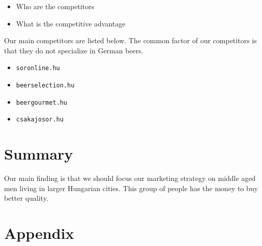 \begin{itemize}
   \item Who are the competitors
   \item What is the competitive advantage
\end{itemize}

Our main competitors are listed below. The common factor of our competitors is that they do not specialize in German beers.
\begin{itemize}
   \item \texttt{soronline.hu} \cite{soronline}
   \item \texttt{beerselection.hu} \cite{beerselection}
   \item \texttt{beergourmet.hu} \cite{beergourmet}
   \item \texttt{csakajosor.hu} \cite{csakajosor}
\end{itemize}


\section{Summary}
Our main finding is that we should focus our marketing strategy on middle aged men living in larger Hungarian cities. This group of people has the money to buy better quality.



\section{Appendix}



